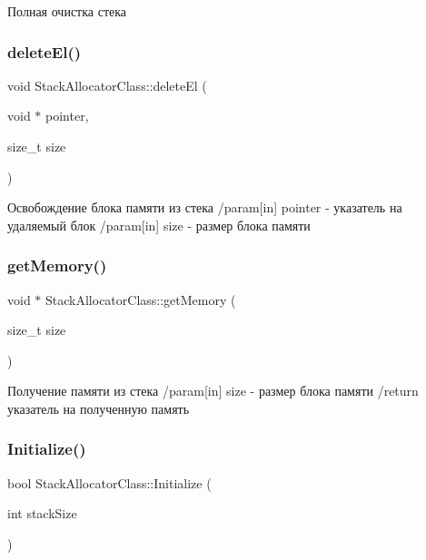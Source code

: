 Полная очистка стека 

\mbox{\label{class_stack_allocator_class_ae855ca80c4d69b42e2e05fd92e7a79e2}} 
\subsubsection{\texorpdfstring{delete\+El()}{deleteEl()}}
{\footnotesize\ttfamily void Stack\+Allocator\+Class\+::delete\+El (\begin{DoxyParamCaption}\item[{void $\ast$}]{pointer,  }\item[{size\+\_\+t}]{size }\end{DoxyParamCaption})}



Освобождение блока памяти из стека /param\mbox{[}in\mbox{]} pointer -\/ указатель на удаляемый блок /param\mbox{[}in\mbox{]} size -\/ размер блока памяти 

\mbox{\label{class_stack_allocator_class_a206f0f9c4966103cbd5f3bcb9226c5b6}} 
\subsubsection{\texorpdfstring{get\+Memory()}{getMemory()}}
{\footnotesize\ttfamily void $\ast$ Stack\+Allocator\+Class\+::get\+Memory (\begin{DoxyParamCaption}\item[{size\+\_\+t}]{size }\end{DoxyParamCaption})}



Получение памяти из стека /param\mbox{[}in\mbox{]} size -\/ размер блока памяти /return указатель на полученную память 

\mbox{\label{class_stack_allocator_class_aaee70832aedfa3d1c6b828131165e24a}} 
\subsubsection{\texorpdfstring{Initialize()}{Initialize()}}
{\footnotesize\ttfamily bool Stack\+Allocator\+Class\+::\+Initialize (\begin{DoxyParamCaption}\item[{int}]{stack\+Size }\end{DoxyParamCaption})}

